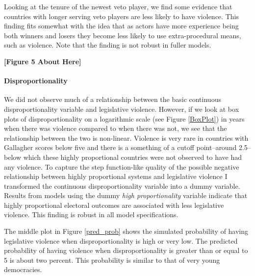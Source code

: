 \documentclass[a4paper]{article}\usepackage{graphicx, color}
\begin{document}
Looking at the tenure of the newest veto player, we find some evidence that countries with longer serving veto players are less likely to have violence. This finding fits somewhat with the idea that as actors have more experience being both winners and losers they become less likely to use extra-procedural means, such as violence. Note that the finding is not robust in fuller models.

\begin{center}

    {\bf{[Figure 5 About Here]}}

\end{center}

\paragraph{Disproportionality}
We did not observe much of a relationship between the basic continuous disproportionality variable and legislative violence. However, if we look at box plots of disproportionality on a logarithmic scale (see Figure \ref{BoxPlot}) in years when there was violence compared to when there was not, we see that the relationship between the two is non-linear. Violence is very rare in countries with Gallagher scores below five and there is a something of a cutoff point--around 2.5--below which these highly proportional countries were not observed to have had any violence. To capture the step function-like quality of the possible negative relationship between highly proportional systems and legislative violence I transformed the continuous disproportionality variable into a dummy variable. Results from models using the dummy {\emph{high proportionality}} variable indicate that highly proportional electoral outcomes are associated with less legislative violence. This finding is robust in all model specifications.

The middle plot in Figure \ref{pred_prob} shows the simulated probability of having legislative violence when disproportionality is high or very low. The predicted probability of having violence when disproportionality is greater than or equal to 5 is about two percent. This probability is similar to that of very young democracies.
\end{document}

